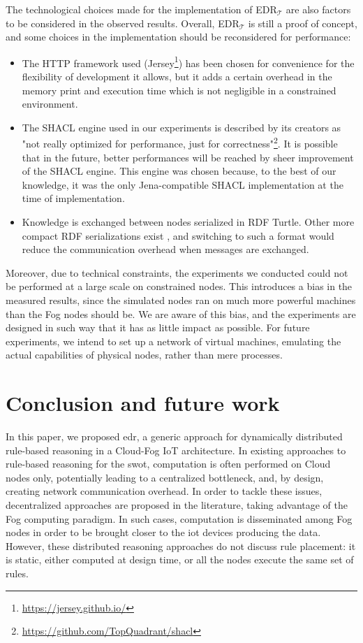 \documentclass[sw]{iosart2x}
\newcommand{\edrt}{EDR$_{\mathcal{T}}$\xspace}
\begin{document}
The technological choices made for the implementation of \edrt are also factors to be considered in the observed results. 
Overall, \edrt is still a proof of concept, and some choices in the implementation should be reconsidered for performance: 
\begin{itemize}
	\item The HTTP framework used (Jersey\footnote{\url{https://jersey.github.io/}}) has been chosen for convenience for the flexibility of development it allows, but it adds a certain overhead in the memory print and execution time which is not negligible in a constrained environment.
	\item The SHACL engine used in our experiments is described by its creators as "not really optimized for performance, just for correctness"\footnote{\url{https://github.com/TopQuadrant/shacl}}.
	It is possible that in the future, better performances will be reached by sheer improvement of the SHACL engine.
	This engine was chosen because, to the best of our knowledge, it was the only Jena-compatible SHACL implementation at the time of implementation.
	\item Knowledge is exchanged between nodes serialized in RDF Turtle. 
	Other more compact RDF serializations exist \cite{Su2015}, and switching to such a format would reduce the communication overhead when messages are exchanged.
\end{itemize}

Moreover, due to technical constraints, the experiments we conducted could not be performed at a large scale on constrained nodes.
This introduces a bias in the measured results, since the simulated nodes ran on much more powerful machines than the Fog nodes should be. 
We are aware of this bias, and the experiments are designed in such way that it has as little impact as possible.
For future experiments, we intend to set up a network of virtual machines, emulating the actual capabilities of physical nodes, rather than mere processes.

\section{Conclusion and future work}
\label{sec:conclusion}

In this paper, we proposed \gls{edr}, a generic approach for dynamically distributed rule-based reasoning in a Cloud-Fog IoT architecture.
In existing approaches to rule-based reasoning for the \gls{swot}, computation is often performed on Cloud nodes only, potentially leading to a centralized bottleneck, and, by design, creating network communication overhead.
In order to tackle these issues, decentralized approaches are proposed in the literature, taking advantage of the Fog computing paradigm. 
In such cases, computation is disseminated among Fog nodes in order to be brought closer to the \gls{iot} devices producing the data.
However, these distributed reasoning approaches do not discuss rule placement: it is static, either computed at design time, or all the nodes execute the same set of rules.
\end{document}
